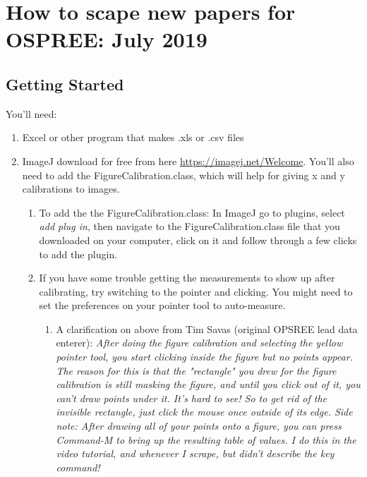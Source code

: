\documentclass{article}[12pt]
\begin{document}
\section*{How to scape new papers for OSPREE: July 2019}
\subsection*{Getting Started}
You'll need:
\begin{enumerate}
\item Excel or other program that makes .xls  or .csv files
\item ImageJ download for free from here \url{https://imagej.net/Welcome}. You'll also need to add the Figure\textunderscore Calibration.class, which will help for giving x and y calibrations to images. 
\begin{enumerate}
\item To add the the Figure\textunderscore Calibration.class: In ImageJ go to plugins, select \textit{add plug in}, then navigate to the Figure\textunderscore Calibration.class file that you downloaded on your computer, click on it and follow through a few clicks to add the plugin.
\item If you have some trouble getting the measurements to show up after calibrating, try switching to the pointer and clicking. You might need to set the preferences on your pointer tool to auto-measure.
\begin{enumerate}
\item A clarification on above from Tim Savas (original OPSREE lead data enterer): \textit{After doing the figure calibration and selecting the yellow pointer tool, you start clicking inside the figure but no points appear. The reason for this is that the "rectangle" you drew for the figure calibration is still masking the figure, and until you click out of it, you can't draw points under it. It's hard to see! So to get rid of the invisible rectangle, just click the mouse once outside of its edge. Side note: After drawing all of your points onto a figure, you can press Command-M to bring up the resulting table of values. I do this in the video tutorial, and whenever I scrape, but didn't describe the key command!}
\end{enumerate}
\end{enumerate}
\end{enumerate}
\end{document}

